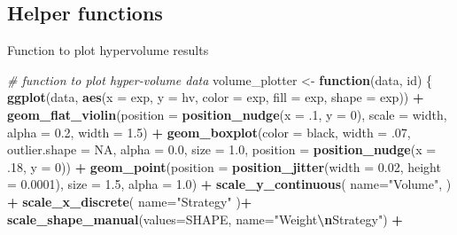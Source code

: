 \documentclass[
]{book}
\newenvironment{Shaded}{\begin{snugshade}}{\end{snugshade}}
\newcommand{\AttributeTok}[1]{\textcolor[rgb]{0.13,0.29,0.53}{#1}}
\newcommand{\CommentTok}[1]{\textcolor[rgb]{0.56,0.35,0.01}{\textit{#1}}}
\newcommand{\ConstantTok}[1]{\textcolor[rgb]{0.56,0.35,0.01}{#1}}
\newcommand{\ControlFlowTok}[1]{\textcolor[rgb]{0.13,0.29,0.53}{\textbf{#1}}}
\newcommand{\DecValTok}[1]{\textcolor[rgb]{0.00,0.00,0.81}{#1}}
\newcommand{\FloatTok}[1]{\textcolor[rgb]{0.00,0.00,0.81}{#1}}
\newcommand{\FunctionTok}[1]{\textcolor[rgb]{0.13,0.29,0.53}{\textbf{#1}}}
\newcommand{\NormalTok}[1]{#1}
\newcommand{\OtherTok}[1]{\textcolor[rgb]{0.56,0.35,0.01}{#1}}
\newcommand{\SpecialCharTok}[1]{\textcolor[rgb]{0.81,0.36,0.00}{\textbf{#1}}}
\newcommand{\StringTok}[1]{\textcolor[rgb]{0.31,0.60,0.02}{#1}}
\begin{document}
\hypertarget{helper-functions}{%
\subsection{Helper functions}\label{helper-functions}}

Function to plot hypervolume results

\begin{Shaded}
\begin{Highlighting}[]
  \CommentTok{\# function to plot hyper{-}volume data}
\NormalTok{  volume\_plotter }\OtherTok{\textless{}{-}} \ControlFlowTok{function}\NormalTok{(data, id)}
\NormalTok{  \{}
    \FunctionTok{ggplot}\NormalTok{(data, }\FunctionTok{aes}\NormalTok{(}\AttributeTok{x =}\NormalTok{ exp, }\AttributeTok{y =}\NormalTok{ hv, }\AttributeTok{color =}\NormalTok{ exp, }\AttributeTok{fill =}\NormalTok{ exp, }\AttributeTok{shape =}\NormalTok{ exp)) }\SpecialCharTok{+}
    \FunctionTok{geom\_flat\_violin}\NormalTok{(}\AttributeTok{position =} \FunctionTok{position\_nudge}\NormalTok{(}\AttributeTok{x =}\NormalTok{ .}\DecValTok{1}\NormalTok{, }\AttributeTok{y =} \DecValTok{0}\NormalTok{), }\AttributeTok{scale =} \StringTok{\textquotesingle{}width\textquotesingle{}}\NormalTok{, }\AttributeTok{alpha =} \FloatTok{0.2}\NormalTok{, }\AttributeTok{width =} \FloatTok{1.5}\NormalTok{) }\SpecialCharTok{+}
    \FunctionTok{geom\_boxplot}\NormalTok{(}\AttributeTok{color =} \StringTok{\textquotesingle{}black\textquotesingle{}}\NormalTok{, }\AttributeTok{width =}\NormalTok{ .}\DecValTok{07}\NormalTok{, }\AttributeTok{outlier.shape =} \ConstantTok{NA}\NormalTok{, }\AttributeTok{alpha =} \FloatTok{0.0}\NormalTok{, }\AttributeTok{size =} \FloatTok{1.0}\NormalTok{, }\AttributeTok{position =} \FunctionTok{position\_nudge}\NormalTok{(}\AttributeTok{x =}\NormalTok{ .}\DecValTok{18}\NormalTok{, }\AttributeTok{y =} \DecValTok{0}\NormalTok{)) }\SpecialCharTok{+}
    \FunctionTok{geom\_point}\NormalTok{(}\AttributeTok{position =} \FunctionTok{position\_jitter}\NormalTok{(}\AttributeTok{width =} \FloatTok{0.02}\NormalTok{, }\AttributeTok{height =} \FloatTok{0.0001}\NormalTok{), }\AttributeTok{size =} \FloatTok{1.5}\NormalTok{, }\AttributeTok{alpha =} \FloatTok{1.0}\NormalTok{) }\SpecialCharTok{+}
    \FunctionTok{scale\_y\_continuous}\NormalTok{(}
      \AttributeTok{name=}\StringTok{"Volume"}\NormalTok{,}
\NormalTok{    ) }\SpecialCharTok{+}
    \FunctionTok{scale\_x\_discrete}\NormalTok{(}
      \AttributeTok{name=}\StringTok{"Strategy"}
\NormalTok{    )}\SpecialCharTok{+}
    \FunctionTok{scale\_shape\_manual}\NormalTok{(}\AttributeTok{values=}\NormalTok{SHAPE, }\AttributeTok{name=}\StringTok{"Weight}\SpecialCharTok{\textbackslash{}n}\StringTok{Strategy"}\NormalTok{) }\SpecialCharTok{+}

\end{Highlighting}
\end{Shaded}
\end{document}
